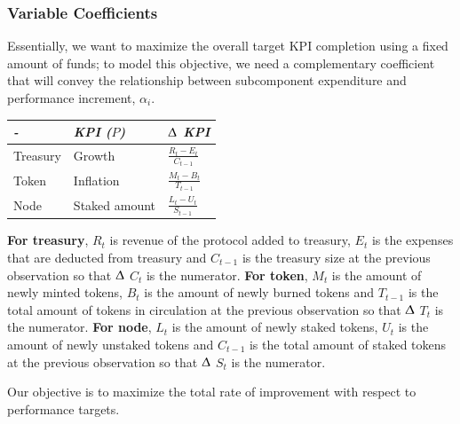 \documentclass[conference,letterpaper]{IEEEtran}
\begin{document}
            \subsubsection{Variable Coefficients} 
                Essentially, we want to maximize the overall target KPI completion using a
                fixed amount of funds; to model this objective, we need a complementary
                coefficient that will convey the relationship between subcomponent
                expenditure and performance increment, $\alpha_i$.
                \begin{center}
                    \begin{tabular}{|p{1.5cm}|p{2cm}|p{1.5cm}|}
                        \hline
                        \textit{-} & \textit{KPI ($P$)}& \textit{ $\Updelta$ KPI} \\
                        \hline
                        Treasury& Growth      &  $\frac{R_t - E_t}{C_{t-1}}$   \\
                        Token   & Inflation   & $\frac{M_t - B_t}{T_{t-1}} $ \\
                        Node    & Staked amount       & $\frac{L_t - U_t}{S_{t-1}}$    \\
                        \hline
                    \end{tabular}      
                \end{center}
                \textbf{For treasury}, $R_t$ is revenue of the protocol added to treasury,
                $E_t$ is the expenses that are deducted from treasury  and $C_{t-1}$ is
                the treasury size at the previous observation so that $\Updelta$ $C_t$ is
                the numerator.
                \newline
                \textbf{For token}, $M_t$ is the amount of newly minted tokens, $B_t$ is
                the amount of newly burned tokens and $T_{t-1}$ is the total amount of
                tokens in circulation at the previous observation so that $\Updelta$ $T_t$ is
                the numerator.
                \newline
                \textbf{For node}, $L_t$ is the amount of newly staked tokens, $U_t$ is
                the amount of newly unstaked tokens and $C_{t-1}$ is the total amount of
                staked tokens at the previous observation so that $\Updelta$ $S_t$ is the
                numerator.
                
                Our objective is to maximize the total rate of improvement with respect to
                performance targets.
\end{document}
